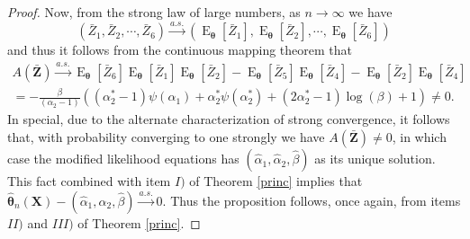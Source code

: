 \documentclass[lineno]{biometrika}
\newcommand{\bs}{\boldsymbol}
\newcommand{\on}{\operatorname}
\begin{document}
\begin{proof}
 Now, from the strong law of large numbers, as $n\to \infty$ we have
\begin{equation*}
\left(\bar{Z}_1,\bar{Z}_2,\cdots,\bar{Z}_6\right)\overset{a.s.}{\to}\left(\on{E}_{\bs{\theta}}\left[\bar{Z}_1\right],\on{E}_{\bs{\theta}}\left[\bar{Z}_2\right],\cdots,\on{E}_{\bs{\theta}}\left[\bar{Z}_6\right]\right)
\end{equation*}
and thus it follows from the continuous mapping theorem that
\begin{equation*}
\begin{aligned}
A(\bs{\bar{Z}})\overset{a.s.}{\to} \on{E}_{\bs{\theta}}\left[\bar{Z}_6\right]\on{E}_{\bs{\theta}}\left[\bar{Z}_1\right]\on{E}_{\bs{\theta}}\left[\bar{Z}_2\right] - \on{E}_{\bs{\theta}}\left[\bar{Z}_5\right]\on{E}_{\bs{\theta}}\left[\bar{Z}_4\right] - \on{E}_{\bs{\theta}}\left[\bar{Z}_2\right]\on{E}_{\bs{\theta}}\left[\bar{Z}_4\right]\\
= -\frac{\beta}{(\alpha_2-1)}\left((\alpha_2^*-1)\psi(\alpha_1) + \alpha_2^*\psi(\alpha_2^*) + (2\alpha_2^*-1)\log(\beta) + 1\right)\neq 0.
\end{aligned}
\end{equation*}
In special, due to the alternate characterization of strong convergence, it follows that, with probability converging to one strongly we have $A(\bs{\bar{Z}})\neq 0$, in which case the modified likelihood equations has $(\hat\alpha_1,\hat\alpha_2,\hat\beta)$ as its unique solution. This fact combined with item $I)$ of Theorem \ref{princ} implies that $\bs{\hat{\theta}}_n(\bs{X})-(\hat\alpha_1,\hat\alpha_2,\hat\beta)\overset{a.s.}{\to} 0$. Thus the proposition follows, once again, from items $II)$ and $III)$ of Theorem \ref{princ}.
\end{proof}



\end{document}
